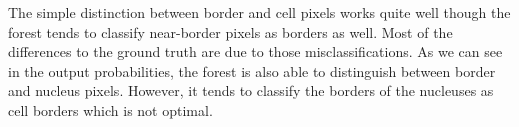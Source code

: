 The simple distinction between border and cell pixels works quite well though the forest
tends to classify near-border pixels as borders as well. Most of the differences to the
ground truth are due to those misclassifications. As we can see in the output probabilities,
the forest is also able to distinguish between border and nucleus pixels. However, it tends
to classify the borders of the nucleuses as cell borders which is not optimal. 